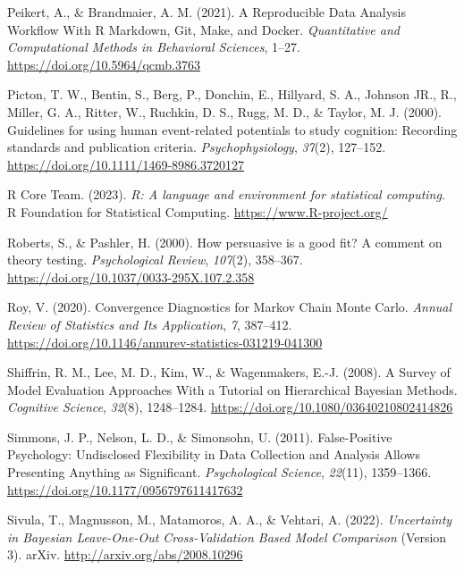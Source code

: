\documentclass[
  doc,12pt,floatsintext]{apa7}
\newlength{\cslhangindent}
\newenvironment{CSLReferences}[2] %
 {\begin{list}{}{%
  \setlength{\itemindent}{0pt}
  \setlength{\leftmargin}{0pt}
  \setlength{\parsep}{0pt}
  \ifodd #1
   \setlength{\leftmargin}{\cslhangindent}
   \setlength{\itemindent}{-1\cslhangindent}
  \fi
  \setlength{\itemsep}{#2\baselineskip}}}
 {\end{list}}
\begin{document}
\begin{CSLReferences}{1}{0}
Peikert, A., \& Brandmaier, A. M. (2021). A {Reproducible Data Analysis Workflow With R Markdown}, {Git}, {Make}, and {Docker}. \emph{Quantitative and Computational Methods in Behavioral Sciences}, 1--27. \url{https://doi.org/10.5964/qcmb.3763}

Picton, T. W., Bentin, S., Berg, P., Donchin, E., Hillyard, S. A., Johnson JR., R., Miller, G. A., Ritter, W., Ruchkin, D. S., Rugg, M. D., \& Taylor, M. J. (2000). Guidelines for using human event-related potentials to study cognition: {Recording} standards and publication criteria. \emph{Psychophysiology}, \emph{37}(2), 127--152. \url{https://doi.org/10.1111/1469-8986.3720127}

R Core Team. (2023). \emph{R: A language and environment for statistical computing}. R Foundation for Statistical Computing. \url{https://www.R-project.org/}

Roberts, S., \& Pashler, H. (2000). How persuasive is a good fit? {A} comment on theory testing. \emph{Psychological Review}, \emph{107}(2), 358--367. \url{https://doi.org/10.1037/0033-295X.107.2.358}

Roy, V. (2020). Convergence {Diagnostics} for {Markov Chain Monte Carlo}. \emph{Annual Review of Statistics and Its Application}, \emph{7}, 387--412. \url{https://doi.org/10.1146/annurev-statistics-031219-041300}

Shiffrin, R. M., Lee, M. D., Kim, W., \& Wagenmakers, E.-J. (2008). A {Survey} of {Model Evaluation Approaches With} a {Tutorial} on {Hierarchical Bayesian Methods}. \emph{Cognitive Science}, \emph{32}(8), 1248--1284. \url{https://doi.org/10.1080/03640210802414826}

Simmons, J. P., Nelson, L. D., \& Simonsohn, U. (2011). False-{Positive Psychology}: {Undisclosed Flexibility} in {Data Collection} and {Analysis Allows Presenting Anything} as {Significant}. \emph{Psychological Science}, \emph{22}(11), 1359--1366. \url{https://doi.org/10.1177/0956797611417632}

Sivula, T., Magnusson, M., Matamoros, A. A., \& Vehtari, A. (2022). \emph{Uncertainty in {Bayesian Leave-One-Out Cross-Validation Based Model Comparison}} (Version 3). arXiv. \url{http://arxiv.org/abs/2008.10296}


\end{CSLReferences}
\end{document}
